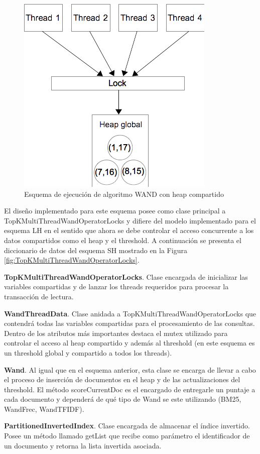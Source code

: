 \begin{figure}[H]
\centering
\includegraphics[scale=.75]{images/wand-heap-compartido.png}
\caption{Esquema de ejecución de algoritmo WAND con heap compartido}
\label{fig:wand-heap-compartido}
\end{figure}

El diseño implementado para este esquema posee como clase principal a TopKMultiThreadWandOperatorLocks y difiere del modelo implementado para el esquema LH en el sentido que ahora se debe controlar el acceso concurrente a los datos compartidos como el heap y el threshold. A continuación se presenta el diccionario de datos del esquema SH mostrado en la Figura \ref{fig:TopKMultiThreadWandOperatorLocks}.

\begin{list}{}{}
	\item \textbf{TopKMultiThreadWandOperatorLocks}. Clase encargada de inicializar las variables compartidas y de lanzar los threads requeridos para procesar la transacción de lectura.
	
	\item \textbf{WandThreadData}. Clase anidada a TopKMultiThreadWandOperatorLocks que contendrá todas las variables compartidas para el procesamiento de las consultas. Dentro de los atributos más importantes destaca el mutex utilizado para controlar el acceso al heap compartido y además al threshold (en este esquema es un threshold global y compartido a todos los threads).
	
	\item \textbf{Wand}. Al igual que en el esquema anterior, esta clase se encarga de llevar a cabo el proceso de inserción de documentos en el heap y de las actualizaciones del threshold. El método scoreCurrentDoc es el encargado de entregarle un puntaje a cada documento y dependerá de qué tipo de Wand se este utilizando (BM25, WandFrec, WandTFIDF). 

	\item \textbf{PartitionedInvertedIndex}. Clase encargada de almacenar el índice invertido. Posee un método llamado getList que recibe como parámetro el identificador de un documento y retorna la lista invertida asociada. 

\end{list}

